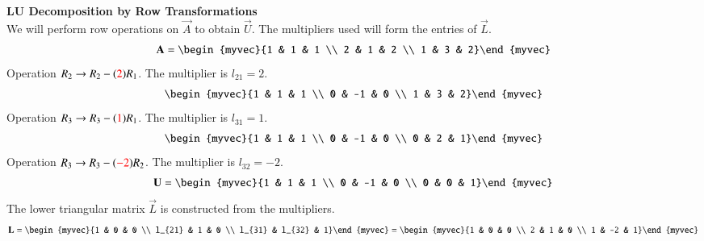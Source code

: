 \documentclass[journal]{IEEEtran}
\begin{document}
	\solution
	
	\textbf{LU Decomposition by Row Transformations}\\
	
	We will perform row operations on $\vec{A}$ to obtain $\vec{U}$. The multipliers used will form the entries of $\vec{L}$.
	\begin{align}
		\vec{A} = \begin{myvec}{1 & 1 & 1 \\ 2 & 1 & 2 \\ 1 & 3 & 2}\end{myvec}
	\end{align}
	Operation $R_2 \to R_2 - (\textcolor{red}{2})R_1$. The multiplier is $l_{21} = 2$.
	\begin{align}
		\begin{myvec}{1 & 1 & 1 \\ 0 & -1 & 0 \\ 1 & 3 & 2}\end{myvec}
	\end{align}
	Operation $R_3 \to R_3 - (\textcolor{red}{1})R_1$. The multiplier is $l_{31} = 1$.
	\begin{align}
		\begin{myvec}{1 & 1 & 1 \\ 0 & -1 & 0 \\ 0 & 2 & 1}\end{myvec}
	\end{align}
	Operation $R_3 \to R_3 - (\textcolor{red}{-2})R_2$. The multiplier is $l_{32} = -2$.
	\begin{align}
		\vec{U} = \begin{myvec}{1 & 1 & 1 \\ 0 & -1 & 0 \\ 0 & 0 & 1}\end{myvec}
	\end{align}
	The lower triangular matrix $\vec{L}$ is constructed from the multipliers.
	\begin{align}
		\vec{L} = \begin{myvec}{1 & 0 & 0 \\ l_{21} & 1 & 0 \\ l_{31} & l_{32} & 1}\end{myvec} = \begin{myvec}{1 & 0 & 0 \\ 2 & 1 & 0 \\ 1 & -2 & 1}\end{myvec}
	\end{align}
	
\end{document}
